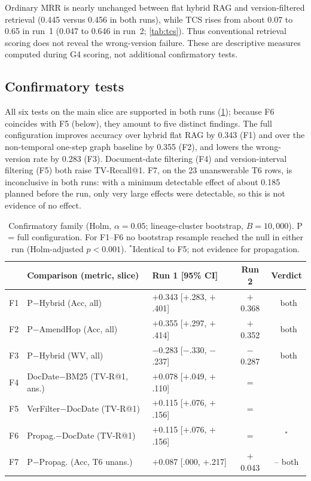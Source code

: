 \documentclass[conference]{IEEEtran}
\newcommand{\cmark}{\textcolor{cGreen}{\ding{51}}}
\begin{document}
Ordinary MRR is nearly unchanged between flat hybrid RAG and version-filtered retrieval (0.445 versus 0.456 in both runs), while TCS rises from about 0.07 to 0.65 in run~1 (0.047 to 0.646 in run~2; \cref{tab:tcs}). Thus conventional retrieval scoring does not reveal the wrong-version failure. These are descriptive measures computed during G4 scoring, not additional confirmatory tests.

\subsection{Confirmatory tests}

All six tests on the main slice are supported in both runs (\cref{tab:confirm}); because F6 coincides with F5 (below), they amount to five distinct findings. The full configuration improves accuracy over hybrid flat RAG by 0.343 (F1) and over the non-temporal one-step graph baseline by 0.355 (F2), and lowers the wrong-version rate by 0.283 (F3). Document-date filtering (F4) and version-interval filtering (F5) both raise TV-Recall@1. F7, on the 23 unanswerable T6 rows, is inconclusive in both runs: with a minimum detectable effect of about 0.185 planned before the run, only very large effects were detectable, so this is not evidence of no effect.

\begin{table}[t]
\centering
\caption{Confirmatory family (Holm, $\alpha=0.05$; lineage-cluster bootstrap, $B=10{,}000$). P = full configuration. For F1--F6 no bootstrap resample reached the null in either run (Holm-adjusted $p<0.001$). $^\ast$Identical to F5; not evidence for propagation.}
\label{tab:confirm}
\setlength{\tabcolsep}{2.0pt}
\scriptsize
\begin{tabular}{@{}l l l c c@{}}
\toprule
 & Comparison (metric, slice) & Run 1 [95\% CI] & Run 2 & Verdict \\
\midrule
F1 & P$-$Hybrid (Acc, all) & $+$0.343 [$+$.283, $+$.401] & $+$0.368 & \cmark\ both \\
F2 & P$-$AmendHop (Acc, all) & $+$0.355 [$+$.297, $+$.414] & $+$0.352 & \cmark\ both \\
F3 & P$-$Hybrid (WV, all) & $-$0.283 [$-$.330, $-$.237] & $-$0.287 & \cmark\ both \\
F4 & DocDate$-$BM25 (TV-R@1, ans.) & $+$0.078 [$+$.049, $+$.110] & = & \cmark \\
F5 & VerFilter$-$DocDate (TV-R@1) & $+$0.115 [$+$.076, $+$.156] & = & \cmark \\
F6 & Propag.$-$DocDate (TV-R@1) & $+$0.115 [$+$.076, $+$.156] & = & \cmark$^\ast$ \\
F7 & P$-$Propag. (Acc, T6 unans.) & $+$0.087 [.000, $+$.217] & $+$0.043 & -- both \\
\bottomrule
\end{tabular}
\end{table}
\end{document}
